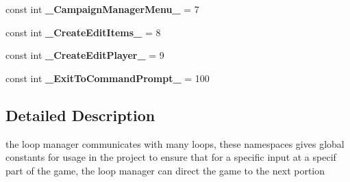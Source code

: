 \begin{DoxyCompactItemize}
const int {\bfseries \+\_\+\+Campaign\+Manager\+Menu\+\_\+} = 7
\item 
\hypertarget{namespace_destination_from_menus_a3bf52bc764ddd7d15b8a423d98a16e37}{}\label{namespace_destination_from_menus_a3bf52bc764ddd7d15b8a423d98a16e37} 
const int {\bfseries \+\_\+\+Create\+Edit\+Items\+\_\+} = 8
\item 
\hypertarget{namespace_destination_from_menus_ab57ef8401e26238764a2621416fc1bf0}{}\label{namespace_destination_from_menus_ab57ef8401e26238764a2621416fc1bf0} 
const int {\bfseries \+\_\+\+Create\+Edit\+Player\+\_\+} = 9
\item 
\hypertarget{namespace_destination_from_menus_a98e9db67799478d29a6520aaa62fcf1e}{}\label{namespace_destination_from_menus_a98e9db67799478d29a6520aaa62fcf1e} 
const int {\bfseries \+\_\+\+Exit\+To\+Command\+Prompt\+\_\+} = 100
\end{DoxyCompactItemize}


\subsection{Detailed Description}
the loop manager communicates with many loops, these namespaces gives global constants for usage in the project to ensure that for a specific input at a specif part of the game, the loop manager can direct the game to the next portion 
